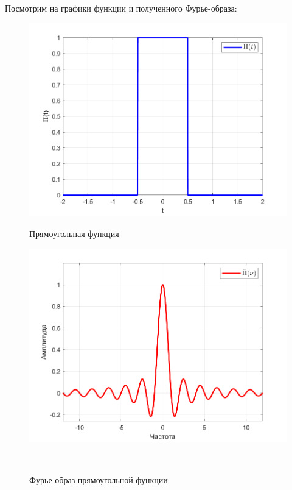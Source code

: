 \documentclass[a4paper]{article}
\begin{document}
Посмотрим на графики функции и полученного Фурье-образа:

\begin{figure}[H]
    \begin{minipage}{0.5\textwidth}
        \centering \includegraphics[width=\textwidth]{graphs/func.png}
        \caption{Прямоугольная функция}
    \end{minipage}\hfill
    \begin{minipage}{0.5\textwidth}
        \centering \includegraphics[width=\textwidth]{graphs/fourier.png}
        \caption{Фурье-образ прямоугольной функции}
    \end{minipage}\\[1em]
\end{figure}\noindent\
\end{document}
